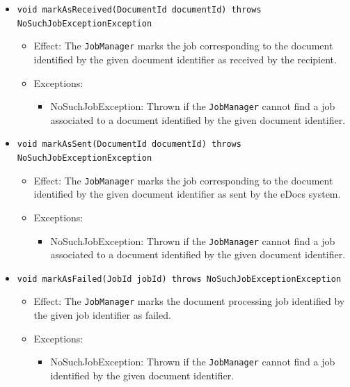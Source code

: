 \documentclass[a4paper,10pt]{article}
\begin{document}
\begin{itemize}
\begin{itemize}
    	\item \texttt{void markAsReceived(DocumentId documentId) throws NoSuchJobExceptionException}
    	\begin{itemize}
    		\item Effect: The \texttt{JobManager} marks the job corresponding to the document identified by the given document identifier as received by the recipient.
    		\item Exceptions:
    		\begin{itemize}
    			\item NoSuchJobException: Thrown if the \texttt{JobManager} cannot find a job associated to a document identified by the given document identifier.
    		\end{itemize}
    	\end{itemize}
    	
     	\item \texttt{void markAsSent(DocumentId documentId) throws NoSuchJobExceptionException}
    	\begin{itemize}
    		\item Effect: The \texttt{JobManager} marks the job corresponding to the document identified by the given document identifier as sent by the eDocs system.
    		\item Exceptions:
    		\begin{itemize}
    			\item NoSuchJobException: Thrown if the \texttt{JobManager} cannot find a job associated to a document identified by the given document identifier.
    		\end{itemize}
    	\end{itemize}       	

  \item \texttt{void markAsFailed(JobId jobId) throws NoSuchJobExceptionException}
    	\begin{itemize}
    		\item Effect: The \texttt{JobManager} marks the document processing job identified by the given job identifier as failed.
    		\item Exceptions:
    		\begin{itemize}
    			\item NoSuchJobException: Thrown if the \texttt{JobManager} cannot find a job identified by the given document identifier.
    		\end{itemize}
    	\end{itemize}        	
    	

\end{itemize}
\end{itemize}
\end{document}
